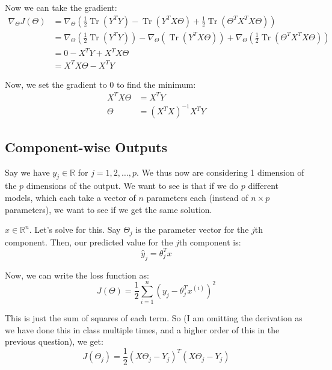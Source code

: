 \documentclass[a4paper]{article}
\DeclareMathOperator{\Tr}{Tr}
\begin{document}
Now we can take the gradient:
\begin{align*}
    \nabla_{\Theta} J(\Theta) &= \nabla_{\Theta} \left( \frac{1}{2} \Tr(Y^T Y) - \Tr(Y^T X\Theta) + \frac{1}{2} \Tr(\Theta^TX^TX\Theta) \right)\\
    &= \nabla_{\Theta} \left( \frac{1}{2} \Tr(Y^T Y) \right) - \nabla_{\Theta} \left( \Tr(Y^T X\Theta) \right) + \nabla_{\Theta} \left( \frac{1}{2} \Tr(\Theta^TX^TX\Theta) \right)\\
    &= 0 - X^TY + X^T X \Theta\\
    &= X^T X \Theta - X^T Y
\end{align*}

Now, we set the gradient to 0 to find the minimum:
\begin{align*}
    X^T X \Theta &= X^T Y\\
    \Theta &= (X^T X)^{-1} X^T Y
\end{align*}

\newpage

\subsection{Component-wise Outputs}

Say we have $y_j \in \mathbb{R}$ for $j = 1, 2, \dots, p$. We thus now are considering 1 dimension of the $p$ dimensions of the output. We want to see is that if we do $p$ different models, which each take a vector of $n$ parameters each (instead of $n\times p$ parameters), we want to see if we get the same solution.

$x \in \mathbb{R}^n$. Let's solve for this. Say $\Theta_j$ is the parameter vector for the $j$th component. Then, our predicted value for the $j$th component is:
\begin{equation*}
    \hat{y}_j = \theta_j^T x
\end{equation*}

Now, we can write the loss function as:
\begin{equation*}
    J(\Theta) = \frac{1}{2} \sum_{i=1}^{n} (y_j - \theta_j^T x^{(i)})^2
\end{equation*}

This is just the sum of squares of each term. So (I am omitting the derivation as we have done this in class multiple times, and a higher order of this in the previous question), we get:
\begin{equation*}
    J(\Theta_j) = \frac{1}{2} (X\Theta_j - Y_j)^T(X\Theta_j - Y_j)
\end{equation*}
\end{document}
